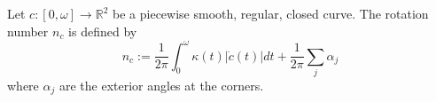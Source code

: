 Let $c: [0, \omega] \to \mathbb{R}^2$ be a piecewise smooth, regular, closed curve. The rotation number $n_c$ is defined by
$$n_c := \frac{1}{2\pi} \int_0^\omega \kappa(t) |\dot{c}(t)| dt + \frac{1}{2\pi} \sum_j \alpha_j$$
where $\alpha_j$ are the exterior angles at the corners.